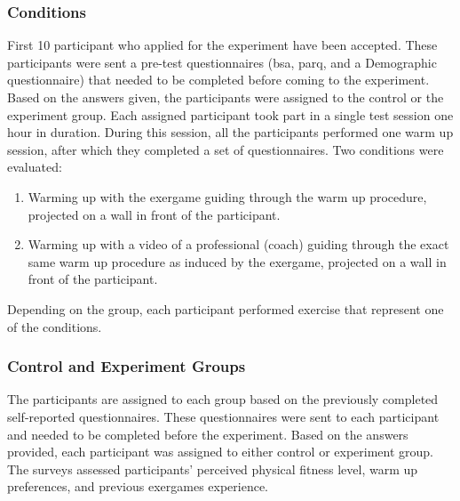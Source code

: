 \subsubsection{Conditions}
First 10 participant who applied for the experiment have been accepted. These participants were sent a pre-test questionnaires (\acrshort{bsa}, \acrshort{parq}, and a Demographic questionnaire) that needed to be completed before coming to the experiment. Based on the answers given, the participants were assigned to the control or the experiment group. Each assigned participant took part in a single test session one hour in duration. During this session, all the participants  performed one warm up session, after which they completed a set of questionnaires. Two conditions were evaluated:
\begin{enumerate}
\item Warming up with the exergame guiding through the warm up procedure, projected on a wall in front of the participant.
\item Warming up with a video of a professional (coach) guiding through the exact same warm up procedure as induced by the exergame, projected on a wall in front of the participant.
\end{enumerate}
Depending on the group, each participant performed exercise that represent one of the conditions.
\subsubsection{Control and Experiment Groups}
The participants are assigned to each group based on the previously completed self-reported questionnaires. These questionnaires were sent to each participant and needed to be completed before the experiment. Based on the answers provided, each participant was assigned to either control or experiment group. The surveys assessed participants' perceived physical fitness level, warm up preferences, and previous exergames experience.
